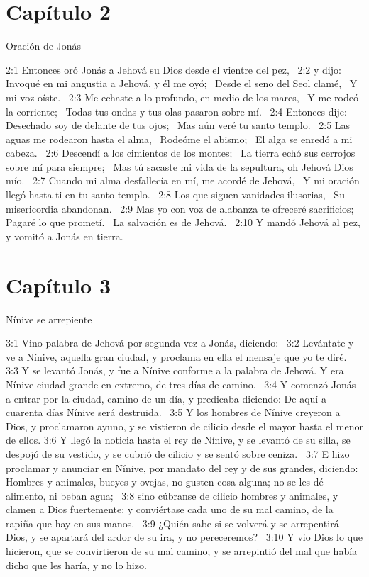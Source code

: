 \section*{Capítulo 2 }
Oración de Jonás  

2:1 Entonces oró Jonás a Jehová su Dios desde el vientre del pez,  
2:2 y dijo:  
Invoqué en mi angustia a Jehová, y él me oyó;  
Desde el seno del Seol clamé,  
Y mi voz oíste.  
2:3 Me echaste a lo profundo, en medio de los mares,  
Y me rodeó la corriente;  
Todas tus ondas y tus olas pasaron sobre mí.  
2:4 Entonces dije: Desechado soy de delante de tus ojos;  
Mas aún veré tu santo templo.  
2:5 Las aguas me rodearon hasta el alma,  
Rodeóme el abismo;  
El alga se enredó a mi cabeza.  
2:6 Descendí a los cimientos de los montes;  
La tierra echó sus cerrojos sobre mí para siempre;  
Mas tú sacaste mi vida de la sepultura, oh Jehová Dios mío.  
2:7 Cuando mi alma desfallecía en mí, me acordé de Jehová,  
Y mi oración llegó hasta ti en tu santo templo.  
2:8 Los que siguen vanidades ilusorias,  
Su misericordia abandonan.  
2:9 Mas yo con voz de alabanza te ofreceré sacrificios;  
Pagaré lo que prometí.  
La salvación es de Jehová.  
2:10 Y mandó Jehová al pez, y vomitó a Jonás en tierra.  
\section*{Capítulo 3 }
Nínive se arrepiente  

3:1 Vino palabra de Jehová por segunda vez a Jonás, diciendo:  
3:2 Levántate y ve a Nínive, aquella gran ciudad, y proclama en ella el mensaje que yo te diré.  
3:3 Y se levantó Jonás, y fue a Nínive conforme a la palabra de Jehová. Y era Nínive ciudad grande en extremo, de tres días de camino.  
3:4 Y comenzó Jonás a entrar por la ciudad, camino de un día, y predicaba diciendo: De aquí a cuarenta días Nínive será destruida.  
3:5 Y los hombres de Nínive creyeron a Dios, y proclamaron ayuno, y se vistieron de cilicio desde el mayor hasta el menor de ellos. 
3:6 Y llegó la noticia hasta el rey de Nínive, y se levantó de su silla, se despojó de su vestido, y se cubrió de cilicio y se sentó sobre ceniza.  
3:7 E hizo proclamar y anunciar en Nínive, por mandato del rey y de sus grandes, diciendo: Hombres y animales, bueyes y ovejas, no gusten cosa alguna; no se les dé alimento, ni beban agua;  
3:8 sino cúbranse de cilicio hombres y animales, y clamen a Dios fuertemente; y conviértase cada uno de su mal camino, de la rapiña que hay en sus manos.  
3:9 ¿Quién sabe si se volverá y se arrepentirá Dios, y se apartará del ardor de su ira, y no pereceremos?  
3:10 Y vio Dios lo que hicieron, que se convirtieron de su mal camino; y se arrepintió del mal que había dicho que les haría, y no lo hizo.  
